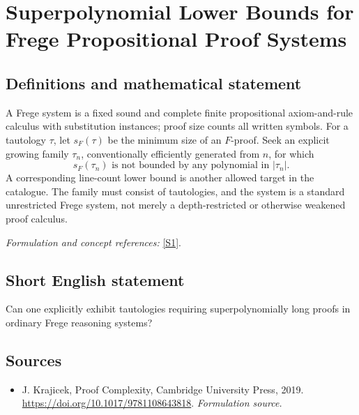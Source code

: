 \documentclass[11pt]{article}
\begin{document}
\section*{\texorpdfstring{Superpolynomial Lower Bounds for Frege Propositional Proof Systems}{Superpolynomial Lower Bounds for Frege Propositional Proof Systems}}\label{statement}
\subsection{Definitions and mathematical statement}
A Frege system is a fixed sound and complete finite propositional axiom-and-rule calculus with substitution instances; proof size counts all written symbols. For a tautology $\tau$, let $s_F(\tau)$ be the minimum size of an $F$-proof. Seek an explicit growing family $\tau_n$, conventionally efficiently generated from $n$, for which
\[
 s_F(\tau_n)\text{ is not bounded by any polynomial in }|\tau_n|.
\]
A corresponding line-count lower bound is another allowed target in the catalogue. The family must consist of tautologies, and the system is a standard unrestricted Frege system, not merely a depth-restricted or otherwise weakened proof calculus.
\par\smallskip\textit{Formulation and concept references:} \href{https://doi.org/10.1017/9781108643818}{[S1]}.

\subsection{Short English statement}
Can one explicitly exhibit tautologies requiring superpolynomially long proofs in ordinary Frege reasoning systems?
\subsection{Sources}
\begin{itemize}
\item[S1]J. Krajicek, Proof Complexity, Cambridge University Press, 2019.
\url{https://doi.org/10.1017/9781108643818}.
\textit{Formulation source.}
\end{itemize}
\end{document}
